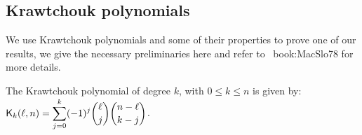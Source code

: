 \documentclass[11pt]{llncs}
\begin{document}








\subsection{Krawtchouk polynomials}
We use Krawtchouk polynomials and some of their properties to prove one of our results, we give the necessary preliminaries here and refer to \eg ~{book:MacSlo78} for more details.

\begin{definition}\label{def:Kraw}
	The Krawtchouk polynomial of degree $k$, with $0\leq k\leq n$ is given by: $ \displaystyle \mathsf{K}_{k}(\ell,n)=\sum_{j=0}^{k} (-1)^j \binom{\ell}{j} \binom{n-\ell}{k-j}$. 
\end{definition}
\end{document}

